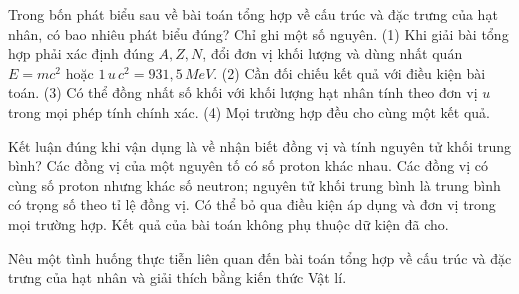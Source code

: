 \begin{ex}
Trong bốn phát biểu sau về bài toán tổng hợp về cấu trúc và đặc trưng của hạt nhân, có bao nhiêu phát biểu đúng? Chỉ ghi một số nguyên. (1) Khi giải bài tổng hợp phải xác định đúng $A,Z,N$, đổi đơn vị khối lượng và dùng nhất quán $E=mc^2$ hoặc $1\,u\,c^2=931,5\,MeV$. (2) Cần đối chiếu kết quả với điều kiện bài toán. (3) Có thể đồng nhất số khối với khối lượng hạt nhân tính theo đơn vị $u$ trong mọi phép tính chính xác. (4) Mọi trường hợp đều cho cùng một kết quả.
\end{ex}

\begin{ex}
Kết luận đúng khi vận dụng là về nhận biết đồng vị và tính nguyên tử khối trung bình?
\choice
{Các đồng vị của một nguyên tố có số proton khác nhau.}
{\True Các đồng vị có cùng số proton nhưng khác số neutron; nguyên tử khối trung bình là trung bình có trọng số theo tỉ lệ đồng vị.}
{Có thể bỏ qua điều kiện áp dụng và đơn vị trong mọi trường hợp.}
{Kết quả của bài toán không phụ thuộc dữ kiện đã cho.}
\end{ex}

\begin{bt}
Nêu một tình huống thực tiễn liên quan đến bài toán tổng hợp về cấu trúc và đặc trưng của hạt nhân và giải thích bằng kiến thức Vật lí.
\end{bt}

